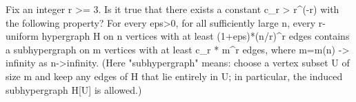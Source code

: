 Fix an integer r >= 3.
Is it true that there exists a constant c_r > r^(-r) with the following property?
For every eps>0, for all sufficiently large n, every r-uniform hypergraph H on n vertices with at least (1+eps)*(n/r)^r edges contains a subhypergraph on m vertices with at least c_r * m^r edges, where m=m(n) -> infinity as n->infinity.
(Here "subhypergraph" means: choose a vertex subset U of size m and keep any edges of H that lie entirely in U; in particular, the induced subhypergraph H[U] is allowed.)
